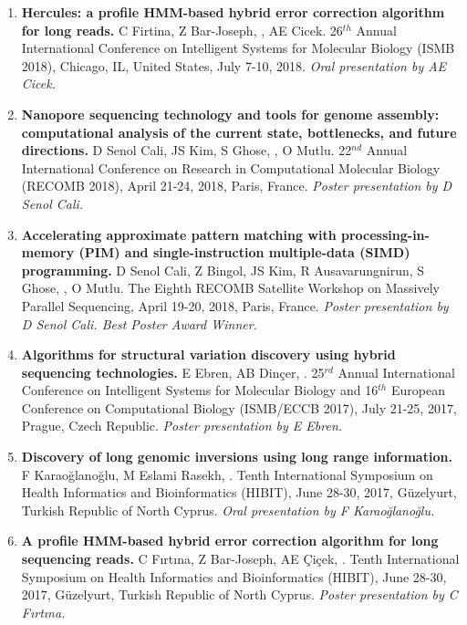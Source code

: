 \begin{enumerate}
\item
        {\bf Hercules: a profile HMM-based hybrid error correction algorithm for long reads.} C Firtina, Z Bar-Joseph, \calkan{}, AE Cicek. 26$^{th}$ Annual International Conference on Intelligent Systems for Molecular Biology (ISMB 2018), Chicago, IL, United States, July 7-10, 2018.
       {\it Oral presentation by AE Cicek.}

\item
       {\bf Nanopore sequencing technology and tools for genome assembly: computational analysis of the current state, bottlenecks, and future directions.}
       D Senol Cali, JS Kim, S Ghose, \calkan{}, O Mutlu.
       22$^{nd}$ Annual International Conference on Research in Computational Molecular Biology (RECOMB 2018), April 21-24, 2018, Paris, France.
       {\it Poster presentation by D Senol Cali.}

\item
       {\bf Accelerating approximate pattern matching with processing-in-memory (PIM) and single-instruction multiple-data (SIMD) programming.}
       D Senol Cali, Z Bingol, JS Kim, R Ausavarungnirun, S Ghose, \calkan{},
       O Mutlu.
       The Eighth RECOMB Satellite Workshop on Massively Parallel Sequencing, April 19-20, 2018,
       Paris, France.
       {\it Poster presentation by D Senol Cali. Best Poster Award Winner.}

\item
       {\bf Algorithms for structural variation discovery using hybrid sequencing technologies.}
       E Ebren, AB Dinçer, \calkan{}.
       25$^{rd}$ Annual International Conference on Intelligent Systems for Molecular Biology and 16$^{th}$ European Conference on 
       Computational Biology  (ISMB/ECCB 2017), 
       July 21-25, 2017, Prague, Czech Republic.
       {\it Poster presentation by E Ebren.}


\item
       {\bf Discovery of long genomic inversions using long range information.} F Karaoğlanoğlu, M Eslami Rasekh, \calkan{}.
       Tenth International Symposium on Health Informatics and Bioinformatics (HIBIT), June 28-30, 2017, Güzelyurt, Turkish Republic of North Cyprus.
       {\it Oral presentation by F Karaoğlanoğlu.}

\item
       {\bf A profile HMM-based hybrid error correction algorithm for long sequencing reads.} C Fırtına, Z Bar-Joseph, AE Çiçek, \calkan{}.
       Tenth International Symposium on Health Informatics and Bioinformatics (HIBIT), June 28-30, 2017, Güzelyurt, Turkish Republic of North Cyprus.
       {\it Poster presentation by C Fırtına.}


\end{enumerate}

